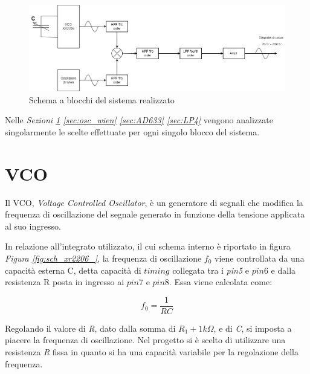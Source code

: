 \documentclass[titlepage]{report}
\begin{document}
	\begin{figure}[h]
		\centering
		\includegraphics[scale=0.5]{Immagini/Schema a blocchi PSEA.png}
		\caption{Schema a blocchi del sistema realizzato}
		\label{fig: Schema a blocchi finale}
	\end{figure}
\space
	\noindent Nelle \textit{Sezioni \ref{sec:VCO} \ref{sec:osc_wien} \ref{sec:AD633} \ref{sec:LP4}} vengono analizzate singolarmente le scelte effettuate per ogni singolo blocco del sistema.
	 
\section{VCO}
	\label{sec:VCO}
	Il VCO, \textit{Voltage Controlled Oscillator}, è un generatore di segnali che modifica la frequenza di oscillazione del segnale generato in funzione della tensione applicata al suo ingresso.
	
	\noindent In relazione all'integrato utilizzato, il cui schema interno è riportato in figura \textit{Figura \ref{fig:sch_xr2206_}}, la frequenza di oscillazione $f_0$ viene controllata da una capacità esterna C, detta capacità di $timing$ collegata tra i \textit{pin5} e $pin6$ e dalla resistenza R posta in ingresso ai $pin7$ e $pin8$. Essa viene calcolata come:
	
	\begin{equation}
		\label{eq:freq_operation}
		f_0 = \frac{1}{RC} 
	\end{equation}

	\noindent Regolando il valore di \textit{R}, dato dalla somma di $R_1 + 1k\Omega$, e di \textit{C}, si imposta a piacere la frequenza di oscillazione.
	Nel progetto si è scelto di utilizzare una resistenza \textit{R} fissa in quanto si ha una capacità variabile per la regolazione della frequenza.
\end{document}
